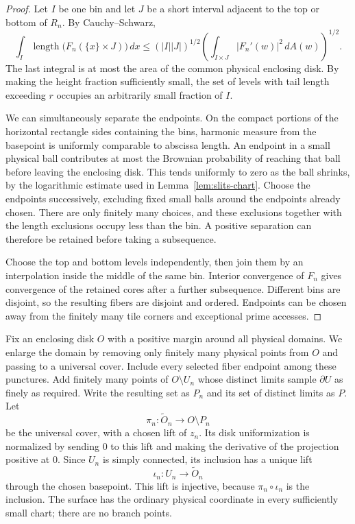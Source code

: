 \begin{proof}
Let $I$ be one bin and let $J$ be a short interval adjacent to the
top or bottom of $R_n$.  By Cauchy--Schwarz,
\begin{equation}\label{eq:slits-length-area}
 \int_I \operatorname{length}
       \bigl(F_n(\{x\}\times J)\bigr)\,dx
 \leq (|I||J|)^{1/2}
       \left(\int_{I\times J}|F_n'(w)|^2\,dA(w)\right)^{1/2}.
\end{equation}
The last integral is at most the area of the common physical
enclosing disk.  By making the height fraction sufficiently small,
the set of levels with tail length exceeding $r$ occupies an
arbitrarily small fraction of $I$.

We can simultaneously separate the endpoints.  On the compact
portions of the horizontal rectangle sides containing the bins,
harmonic measure from the basepoint is uniformly comparable to
abscissa length.  An endpoint in a small physical ball contributes
at most the Brownian probability of reaching that ball before
leaving the enclosing disk.  This tends uniformly to zero as the
ball shrinks, by the logarithmic estimate used in
Lemma~\ref{lem:slits-chart}.  Choose the endpoints successively,
excluding fixed small balls around the endpoints already chosen.
There are only finitely many choices, and these exclusions together
with the length exclusions occupy less than the bin.  A positive
separation can therefore be retained before taking a subsequence.

Choose the top and bottom levels independently, then join them by
an interpolation inside the middle of the same bin.  Interior
convergence of $F_n$ gives convergence of the retained cores after
a further subsequence.  Different bins are disjoint, so the resulting
fibers are disjoint and ordered.  Endpoints can be chosen away from
the finitely many tile corners and exceptional prime accesses.
\end{proof}

Fix an enclosing disk $O$ with a positive margin around all physical
domains.  We enlarge the domain by removing only finitely many
physical points from $O$ and passing to a universal cover.  Include every selected
fiber endpoint among these punctures.  Add finitely many points of
$O\setminus U_n$ whose distinct limits sample $\partial U$ as finely
as required.  Write the resulting set as $P_n$ and its set of
distinct limits as $P$.  Let
\[
 \pi_n:\widetilde O_n\longrightarrow O\setminus P_n
\]
be the universal cover, with a chosen lift of $z_n$.  Its disk
uniformization is normalized by sending $0$ to this lift and making
the derivative of the projection positive at $0$.  Since $U_n$ is
simply connected, its inclusion has a unique lift
\[
 \iota_n:U_n\longrightarrow\widetilde O_n
\]
through the chosen basepoint.  This lift is injective, because
$\pi_n\circ\iota_n$ is the inclusion.  The surface has the ordinary
physical coordinate in every sufficiently small chart; there are
no branch points.

